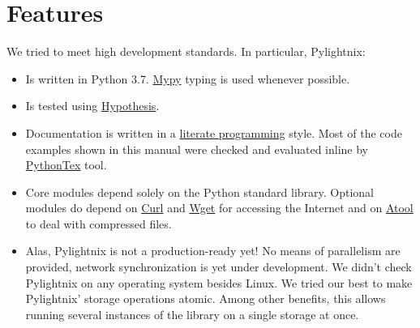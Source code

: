 \section{Features}

We tried to meet high development standards. In particular, Pylightnix:
\begin{itemize}
  \item Is written in Python 3.7. \href{http://mypy-lang.org/}{Mypy} typing is
    used whenever possible.
  \item Is tested using \href{https://pypi.org/project/hypothesis/}{Hypothesis}.
  \item Documentation is written in a
    \href{https://en.wikipedia.org/wiki/Literate_programming}{literate
    programming} style. Most of the code examples shown in this manual were
    checked and evaluated inline by
    \href{https://github.com/gpoore/pythontex}{PythonTex} tool.
  \item Core modules depend solely on the Python standard library. Optional
    modules do depend on \href{https://curl.se/}{Curl} and
    \href{https://www.gnu.org/software/wget/}{Wget} for accessing the Internet
    and on \href{https://www.nongnu.org/atool/}{Atool} to deal with compressed
    files.
  \item Alas, Pylightnix is not a production-ready yet! No means of parallelism
    are provided, network synchronization is yet under development.  We didn't
    check Pylightnix on any operating system besides Linux. We tried our best
    to make Pylightnix' storage operations atomic. Among other benefits,
    this allows running several instances of the library on a single
    storage at once.
\end{itemize}

